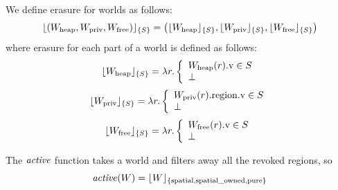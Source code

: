 \documentclass[a4paper]{article}
\begin{document}
We define erasure for worlds as follows:
\[
\lfloor (W_{\mathrm{heap}},W_{\mathrm{priv}},W_{\mathrm{free}}) \rfloor_{\{S\}} =
  \left( \lfloor W_{\mathrm{heap}} \rfloor_{\{S\}},\lfloor W_{\mathrm{priv}} \rfloor_{\{S\}},\lfloor W_{\mathrm{free}} \rfloor_{\{S\}} \right)
\]
where erasure for each part of a world is defined as follows:
\[
\lfloor W_{\mathrm{heap}} \rfloor_{\{S\}} = \lambda r \ldotp \left\{
    \begin{array}{l}
      W_{\mathrm{heap}}(r).\mathrm{v} \in S\\
      \bot
    \end{array}
  \right.
\]
\[
\lfloor W_{\mathrm{priv}} \rfloor_{\{S\}} = \lambda r \ldotp \left\{
    \begin{array}{l}
      W_{\mathrm{priv}}(r).\mathrm{region}.\mathrm{v} \in S \\
      \bot
    \end{array}
  \right.
\]
\[
\lfloor W_{\mathrm{free}} \rfloor_{\{S\}} = \lambda r \ldotp \left\{
    \begin{array}{l}
      W_{\mathrm{free}}(r).\mathrm{v} \in S\\
      \bot
    \end{array}
  \right.
\]

The $\activeReg{}$ function takes a world and filters away all the revoked regions, so
\[
  \activeReg{W} = \erase{W}{\spatial,\spatialo,\pure}
\]
\end{document}
